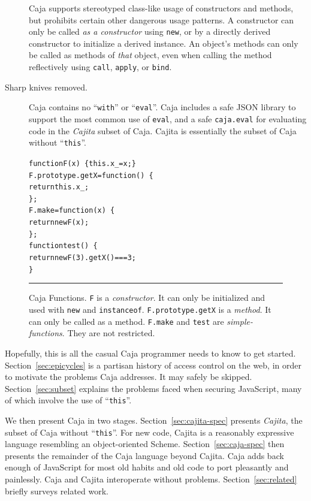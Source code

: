 \documentclass[letterpaper,twocolumn,10pt]{article}
\newcommand{\code}[1]{{\tt {#1}}}              %
\begin{document}
\begin{description}
  Caja supports stereotyped class-like usage of constructors and methods, but 
  prohibits certain other dangerous usage patterns. A constructor can only be 
  called \emph{as a constructor} using \code{new}, or by a directly derived 
  constructor to initialize a derived instance. An object's methods can only 
  be called as methods of \emph{that} object, even when calling the method 
  reflectively using \code{call}, \code{apply}, or \code{bind}.
 
  \item[Sharp knives removed.] Caja contains no ``\code{with}'' or 
  ``\code{eval}''. Caja includes a safe JSON library to support the most 
  common use of \code{eval}, and a safe \code{caja.eval} for evaluating code 
  in the \emph{Cajita} subset of Caja. Cajita is essentially the subset of 
  Caja without ``\code{this}''.
 
\end{description}

\begin{figure}[t!]
\begin{alltt}
function F(x)\ \{ this.x_ = x; \}
F.prototype.getX = function()\ \{
  return this.x_;
\};
F.make = function(x)\ \{
  return new F(x);
\};
function test()\ \{
  return new F(3).getX() === 3;
\}
\end{alltt}

\caption[Caja Functions]{Caja Functions. \code{F} is a \emph{constructor}. It 
can only be initialized and used with \code{new} and \code{instanceof}. 
\code{F.prototype.getX} is a \emph{method}. It can only be called as a 
method. \code{F.make} and \code{test} are \emph{simple-functions}. They are
not restricted. \\ } \hrule
\label{fig:func-obj}
\end{figure}

Hopefully, this is all the casual Caja programmer needs to know to get 
started. Section~\ref{sec:epicycles} is a partisan history of access control 
on the web, in order to motivate the problems Caja addresses. It may safely 
be skipped. Section~\ref{sec:subset} explains the problems faced when 
securing JavaScript, many of which involve the use of ``\code{this}''.

We then present Caja in two stages. Section~\ref{sec:cajita-spec} presents 
\emph{Cajita}, the subset of Caja without ``\code{this}''. For new code, 
Cajita is a reasonably expressive language resembling an object-oriented 
Scheme. Section~\ref{sec:caja-spec} then presents the remainder of the Caja 
language beyond Cajita. Caja adds back enough of JavaScript for most old 
habits and old code to port pleasantly and painlessly. Caja and Cajita 
interoperate without problems. Section~\ref{sec:related} briefly 
surveys related work.
\end{document}
